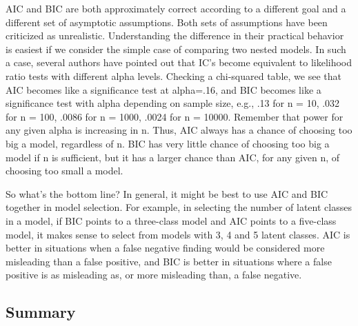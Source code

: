 AIC and BIC are both approximately correct according to a different goal
and a different set of asymptotic assumptions. Both sets of assumptions
have been criticized as unrealistic. Understanding the difference in
their practical behavior is easiest if we consider the simple case of
comparing two nested models. In such a case, several authors have
pointed out that IC's become equivalent to likelihood ratio tests with
different alpha levels. Checking a chi-squared table, we see that AIC
becomes like a significance test at alpha=.16, and BIC becomes like a
significance test with alpha depending on sample size, e.g., .13 for n =
10, .032 for n = 100, .0086 for n = 1000, .0024 for n = 10000. Remember
that power for any given alpha is increasing in n. Thus, AIC always has
a chance of choosing too big a model, regardless of n. BIC has very
little chance of choosing too big a model if n is sufficient, but it has
a larger chance than AIC, for any given n, of choosing too small a
model.

So what's the bottom line? In general, it might be best to use AIC and
BIC together in model selection. For example, in selecting the number of
latent classes in a model, if BIC points to a three-class model and AIC
points to a five-class model, it makes sense to select from models with
3, 4 and 5 latent classes. AIC is better in situations when a false
negative finding would be considered more misleading than a false
positive, and BIC is better in situations where a false positive is as
misleading as, or more misleading than, a false
negative.

\subsection{Summary}\label{summary}

